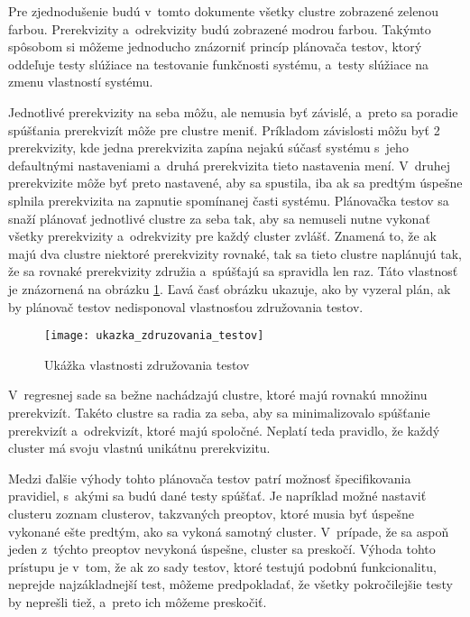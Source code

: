 Pre zjednodušenie budú v~tomto dokumente všetky clustre zobrazené 
zelenou farbou.
Prerekvizity a~odrekvizity budú zobrazené modrou farbou. Takýmto spôsobom
si môžeme jednoducho znázorniť princíp plánovača testov, ktorý oddeľuje testy
slúžiace na testovanie funkčnosti systému, a~testy slúžiace na zmenu 
vlastností systému.

Jednotlivé prerekvizity na seba môžu, ale nemusia byť závislé, a~preto 
sa poradie spúšťania prerekvizít môže pre clustre meniť.
Príkladom závislosti môžu byť 2 prerekvizity, kde jedna prerekvizita 
zapína nejakú súčasť systému s~jeho defaultnými nastaveniami 
a~druhá prerekvizita tieto nastavenia mení. 
V~druhej prerekvizite môže byť preto nastavené, aby sa spustila, iba ak 
sa predtým úspešne splnila prerekvizita na zapnutie spomínanej časti 
systému. Plánovačka testov sa snaží plánovať jednotlivé clustre za seba 
tak, aby sa nemuseli nutne vykonať všetky prerekvizity a~odrekvizity pre 
každý cluster zvlášť. Znamená to, že ak majú dva clustre niektoré 
prerekvizity rovnaké, tak sa tieto clustre naplánujú tak, že sa rovnaké 
prerekvizity združia a~spúšťajú sa spravidla len raz. 
Táto vlastnosť je znázornená na obrázku 
\ref{obrazok:ukazka_zdruzovania_testov}. 
Ľavá časť obrázku ukazuje, ako by vyzeral plán, ak by plánovač testov
nedisponoval vlastnosťou združovania testov.

\begin{figure}[h]
  \begin{center}
    \texttt{[image: ukazka\_zdruzovania\_testov]}
    \caption{Ukážka vlastnosti združovania testov}
    \label{obrazok:ukazka_zdruzovania_testov}
  \end{center}
\end{figure}

V~regresnej sade sa bežne nachádzajú clustre, ktoré majú rovnakú množinu 
prerekvizít. Takéto clustre sa radia za seba, aby sa minimalizovalo
spúšťanie prerekvizít a~odrekvizít, ktoré majú spoločné. Neplatí teda 
pravidlo, že každý cluster má svoju vlastnú unikátnu prerekvizitu.



Medzi ďalšie výhody tohto plánovača testov patrí možnosť špecifikovania 
pravidiel, s~akými sa budú dané testy spúšťať. Je napríklad možné 
nastaviť clusteru zoznam clusterov, takzvaných preoptov, ktoré musia byť 
úspešne vykonané ešte predtým, ako sa vykoná samotný cluster. V~prípade, 
že sa aspoň jeden z~týchto preoptov nevykoná úspešne, cluster sa preskočí.
Výhoda tohto prístupu je v~tom, že ak zo sady testov, ktoré testujú 
podobnú funkcionalitu, neprejde najzákladnejší test, môžeme predpokladať, 
že všetky pokročilejšie testy by neprešli tiež, a~preto ich môžeme preskočiť.

